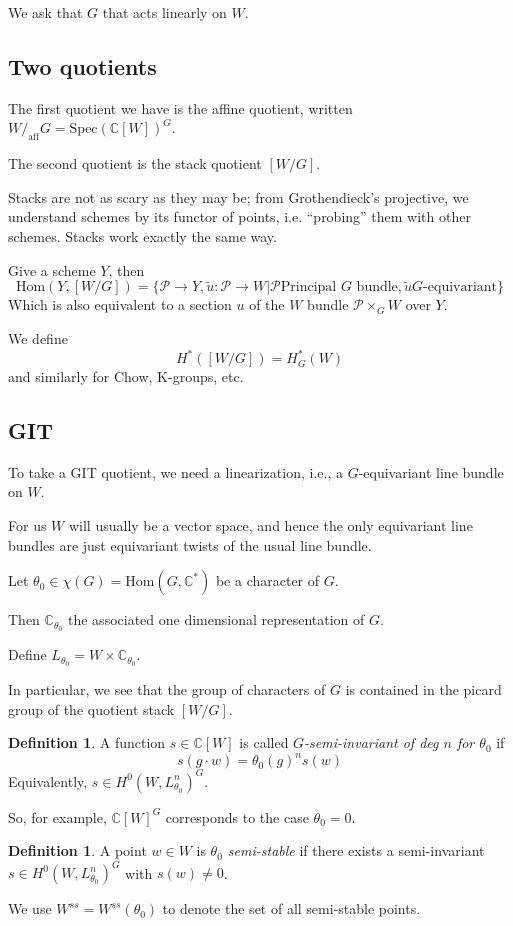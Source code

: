 \documentclass{amsart}
\theoremstyle{definition}
\newtheorem{definition}[dummy]{Definition}
\newcommand{\Spec}{\text{Spec}}
\newcommand{\aff}{\text{aff}}
\newcommand{\C}{\mathbb{C}}
\newcommand{\Hom}{\text{Hom}}
\begin{document}
We ask that $G$ that acts linearly on $W$.

\subsection{Two quotients}
The first quotient we have is the affine quotient, written $W/_\aff G=\Spec(\C[W])^G$. 

The second quotient is the stack quotient $[W/G]$.  

Stacks are not as scary as they may be; from Grothendieck's projective, we understand schemes by its functor of points, i.e. ``probing'' them with other schemes.  Stacks work exactly the same way.

Give a scheme $Y$, then 
$$\Hom(Y, [W/G])=\{\mathcal{P}\to Y, \tilde{u}:\mathcal{P}\to W|\mathcal{P} \text{Principal $G$ bundle}, \tilde{u} \text{$G$-equivariant}\}$$
Which is also equivalent to a section $u$ of the $W$ bundle $\mathcal{P}\times_G W$ over $Y$.

We define
$$H^*([W/G])=H_G^*(W)$$
and similarly for Chow, K-groups, etc.


\subsection{GIT}

To take a GIT quotient, we need a linearization, i.e., a $G$-equivariant line bundle on $W$.  

For us $W$ will usually be a vector space, and hence the only equivariant line bundles are just equivariant twists of the usual line bundle.

Let $\theta_0\in \chi(G)=\Hom(G,\C^*)$ be a character of $G$.

Then $\C_{\theta_0}$ the associated one dimensional representation of $G$.

Define $L_{\theta_0}=W\times\C_{\theta_0}$.

In particular, we see that the group of characters of $G$ is contained in the picard group of the quotient stack $[W/G]$.

\begin{definition}
A function $s\in\C[W]$ is called \emph{$G$-semi-invariant of deg $n$ for $\theta_0$} if 
$$s(g\cdot w)=\theta_0(g)^ns(w)$$
Equivalently, $s\in H^0(W, L_{\theta_0}^n)^G$.
\end{definition}

So, for example, $\C[W]^G$ corresponds to the case $\theta_0=0$.

\begin{definition}
A point $w\in W$ is \emph{$\theta_0$ semi-stable} if there exists a semi-invariant $s\in H^0(W, L^n_{\theta_0})^G$ with $s(w)\neq 0$.

We use $W^{ss}=W^{ss}(\theta_0)$ to denote the set of all semi-stable points.
\end{definition}
\end{document}
